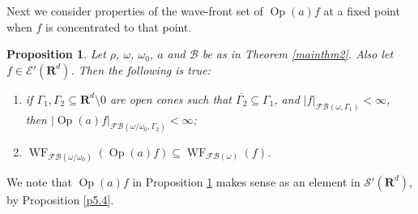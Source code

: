\documentclass[12pt,a4paper,reqno]{amsart}
\numberwithin{equation}{section}
\numberwithin{thm}{section}
\newtheorem{prop}[thm]{Proposition}
\theoremstyle{definition}
\theoremstyle{remark}
\begin{document}
\par

Next we consider properties of the wave-front set of ${\operatorname{Op}} (a)f$ at a
fixed point when $f$ is concentrated to that point.

\par

\begin{prop}\label{keyprop2AA}
Let $\rho$, $\omega$, $\omega _0$, $a$ and $\mathscr B$ be as in Theorem \ref{mainthm2}. Also let 
$f\in \mathscr E'({\mathbf R^{d}})$. Then the following is true:
\begin{enumerate}
\item if $\Gamma _1,\Gamma _2\subseteq {\mathbf R^{d}}{\setminus 0}$ are open cones such that $\overline{\Gamma _2}\subseteq \Gamma _1$, and
$|f|_{{\mathscr F\! \mathscr B} (\omega ,\Gamma _1)}<\infty$, then $|{\operatorname{Op}} (a)f|_{{\mathscr F\! \mathscr B} (\omega /\omega _0,\Gamma _2)}<\infty$;

{\vspace{0.1cm}}

\item ${\operatorname{WF}}  _{{\mathscr F\! \mathscr B} (\omega /\omega _0)}({\operatorname{Op}} (a)f)\subseteq
{\operatorname{WF}} _{{\mathscr F\! \mathscr B} (\omega )}(f)$.
\end{enumerate}
\end{prop}

\par

We note that ${\operatorname{Op}} (a)f$ in Proposition \ref{keyprop2AA} makes sense as
an element in $\mathscr S'({\mathbf R^{d}})$, by Proposition \ref{p5.4}.

\par
\end{document}
